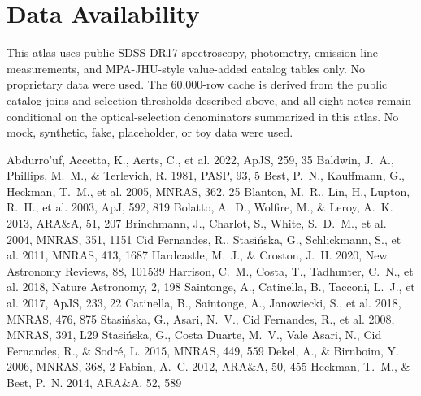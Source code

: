 \documentclass[twocolumn]{aastex631}
\begin{document}
\section*{Data Availability}
This atlas uses public SDSS DR17 spectroscopy, photometry, emission-line measurements, and MPA-JHU-style value-added catalog tables only. No proprietary data were used. The 60,000-row cache is derived from the public catalog joins and selection thresholds described above, and all eight notes remain conditional on the optical-selection denominators summarized in this atlas. No mock, synthetic, fake, placeholder, or toy data were used.


\begin{thebibliography}{}
 Abdurro'uf, Accetta, K., Aerts, C., et al. 2022, ApJS, 259, 35
 Baldwin, J.~A., Phillips, M.~M., \& Terlevich, R. 1981, PASP, 93, 5
 Best, P.~N., Kauffmann, G., Heckman, T.~M., et al. 2005, MNRAS, 362, 25
 Blanton, M.~R., Lin, H., Lupton, R.~H., et al. 2003, ApJ, 592, 819
 Bolatto, A.~D., Wolfire, M., \& Leroy, A.~K. 2013, ARA\&A, 51, 207
 Brinchmann, J., Charlot, S., White, S.~D.~M., et al. 2004, MNRAS, 351, 1151
 Cid Fernandes, R., Stasi{\'n}ska, G., Schlickmann, S., et al. 2011, MNRAS, 413, 1687
 Hardcastle, M.~J., \& Croston, J.~H. 2020, New Astronomy Reviews, 88, 101539
 Harrison, C.~M., Costa, T., Tadhunter, C.~N., et al. 2018, Nature Astronomy, 2, 198
 Saintonge, A., Catinella, B., Tacconi, L.~J., et al. 2017, ApJS, 233, 22
 Catinella, B., Saintonge, A., Janowiecki, S., et al. 2018, MNRAS, 476, 875
 Stasi{\'n}ska, G., Asari, N.~V., Cid Fernandes, R., et al. 2008, MNRAS, 391, L29
 Stasi{\'n}ska, G., Costa Duarte, M.~V., Vale Asari, N., Cid Fernandes, R., \& Sodr{\'e}, L. 2015, MNRAS, 449, 559
 Dekel, A., \& Birnboim, Y. 2006, MNRAS, 368, 2
 Fabian, A.~C. 2012, ARA\&A, 50, 455
 Heckman, T.~M., \& Best, P.~N. 2014, ARA\&A, 52, 589

\end{thebibliography}
\end{document}
